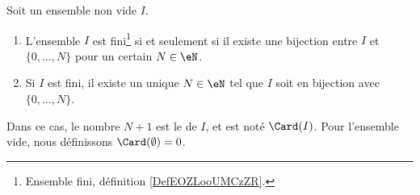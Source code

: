 \begin{propositionDef}     \label{PROPooJLGKooDCcnWi}
	Soit un ensemble non vide \( I\).
	\begin{enumerate}
		\item   \label{ITEMooMNMTooEOIjdo}
		      L'ensemble \( I\) est fini\footnote{Ensemble fini, définition \ref{DefEOZLooUMCzZR}.} si et seulement si il existe une bijection entre \( I\) et \( \{ 0,\ldots, N \}\) pour un certain \( N\in \eN\).
		\item   \label{ITEMooZJFUooSNUSIk}
		      Si \( I\) est fini, il existe un unique \( N\in \eN\) tel que \( I\) soit en bijection avec \( \{ 0,\ldots, N \}\).
	\end{enumerate}
	Dans ce cas, le nombre \( N+1\) est le  de \( I\), et est noté \( \Card(I)\). Pour l'ensemble vide, nous définissons \( \Card(\emptyset)=0\).
\end{propositionDef}

